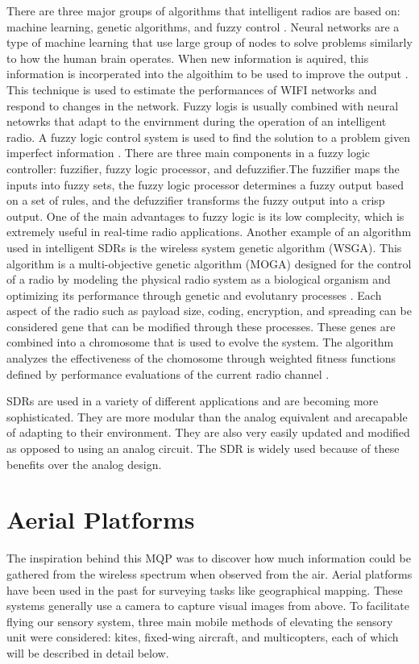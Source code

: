 There are three major groups of algorithms that intelligent radios are based on: machine learning, genetic algorithms, and fuzzy control \cite{amraoui2012intelligent}. Neural networks are a type of machine learning that use large group of nodes to solve problems similarly to how the human brain operates. When new information is aquired, this information is incorperated into the algoithim to be used to improve the output \cite{amini2011universal}. This technique is used to estimate the performances of WIFI networks and respond to changes in the network. Fuzzy logis is usually combined with neural netowrks that adapt to the envirnment during the operation of an intelligent radio. A fuzzy logic control system is used to find the solution to a problem given imperfect information \cite{amraoui2012intelligent}. There are three main components in a fuzzy logic controller: fuzzifier, fuzzy logic processor, and defuzzifier.The fuzzifier maps the inputs into fuzzy sets, the fuzzy logic processor determines a fuzzy output based on a set of rules, and the defuzzifier transforms the fuzzy output into a crisp output. One of the main advantages to fuzzy logic is its low complecity, which is extremely useful in real-time radio applications. Another example of an algorithm used in intelligent SDRs is the wireless system genetic algorithm (WSGA). This algorithm is a multi-objective genetic algorithm (MOGA) designed for the control of a radio by modeling the physical radio system as a biological organism and optimizing its performance through genetic and evolutanry processes \cite{rondeau2004cognitive}. Each aspect of the radio such as payload size, coding, encryption, and spreading can be considered gene that can be modified through these processes. These genes are combined into a chromosome that is used to evolve the system. The algorithm analyzes the effectiveness of the chomosome through weighted fitness functions defined by performance evaluations of the current radio channel \cite{rondeau2004cognitive}.\par
SDRs are used in a variety of different applications and are becoming more sophisticated. They are more modular than the analog equivalent and arecapable of adapting to their environment. They are also very easily updated and modified as opposed to using an analog circuit. The SDR is widely used because of these benefits over the analog design.

\section{Aerial Platforms}
The inspiration behind this MQP was to discover how much information could be gathered from the wireless spectrum when observed from the air. Aerial platforms have been used in the past for surveying tasks like geographical mapping. \cite{geomap_patent} These systems generally use a camera to capture visual images from above. To facilitate flying our sensory system, three main mobile methods of elevating the sensory unit were considered: kites, fixed-wing aircraft, and multicopters, each of which will be described in detail below.

